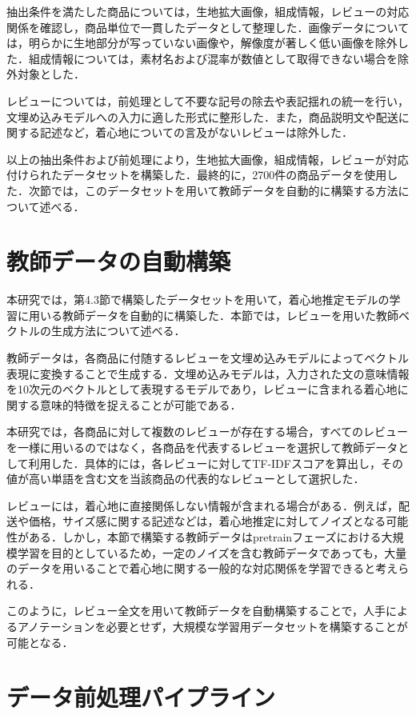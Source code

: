 \documentclass[a4paper,12pt]{jreport}
\begin{document}
抽出条件を満たした商品については，生地拡大画像，組成情報，レビューの対応関係を確認し，商品単位で一貫したデータとして整理した．画像データについては，明らかに生地部分が写っていない画像や，解像度が著しく低い画像を除外した．組成情報については，素材名および混率が数値として取得できない場合を除外対象とした．

レビューについては，前処理として不要な記号の除去や表記揺れの統一を行い，文埋め込みモデルへの入力に適した形式に整形した．また，商品説明文や配送に関する記述など，着心地についての言及がないレビューは除外した．

以上の抽出条件および前処理により，生地拡大画像，組成情報，レビューが対応付けられたデータセットを構築した．最終的に，2700件の商品データを使用した．次節では，このデータセットを用いて教師データを自動的に構築する方法について述べる．


\section{教師データの自動構築}
本研究では，第4.3節で構築したデータセットを用いて，着心地推定モデルの学習に用いる教師データを自動的に構築した．本節では，レビューを用いた教師ベクトルの生成方法について述べる．

教師データは，各商品に付随するレビューを文埋め込みモデルによってベクトル表現に変換することで生成する．文埋め込みモデルは，入力された文の意味情報を10次元のベクトルとして表現するモデルであり，レビューに含まれる着心地に関する意味的特徴を捉えることが可能である．

本研究では，各商品に対して複数のレビューが存在する場合，すべてのレビューを一様に用いるのではなく，各商品を代表するレビューを選択して教師データとして利用した．具体的には，各レビューに対してTF-IDFスコアを算出し，その値が高い単語を含む文を当該商品の代表的なレビューとして選択した．

レビューには，着心地に直接関係しない情報が含まれる場合がある．例えば，配送や価格，サイズ感に関する記述などは，着心地推定に対してノイズとなる可能性がある．しかし，本節で構築する教師データはpretrainフェーズにおける大規模学習を目的としているため，一定のノイズを含む教師データであっても，大量のデータを用いることで着心地に関する一般的な対応関係を学習できると考えられる．

このように，レビュー全文を用いて教師データを自動構築することで，人手によるアノテーションを必要とせず，大規模な学習用データセットを構築することが可能となる． 

\section{データ前処理パイプライン}
\end{document}
